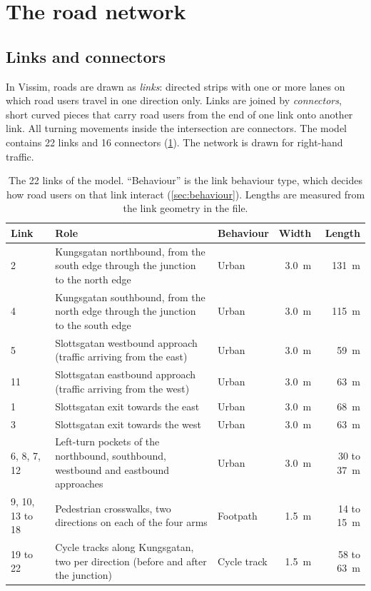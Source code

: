 \documentclass[11pt,a4paper]{article}
\begin{document}
\section{The road network}
\label{sec:network}

\subsection{Links and connectors}

In Vissim, roads are drawn as \emph{links}: directed strips with one or more lanes on which road
users travel in one direction only. Links are joined by \emph{connectors}, short curved pieces that
carry road users from the end of one link onto another link. All turning movements inside the
intersection are connectors. The model contains 22 links and 16 connectors
(\cref{tab:links}). The network is drawn for right-hand traffic.

\begin{table}[!htb]
\centering
\caption[Links of the model]{The 22 links of the model. ``Behaviour'' is the link behaviour type,
which decides how road users on that link interact (\cref{sec:behaviour}). Lengths are measured
from the link geometry in the file.}
\label{tab:links}
\small
\begin{tabularx}{\textwidth}{lXlrr}
\toprule
\textbf{Link} & \textbf{Role} & \textbf{Behaviour} & \textbf{Width} & \textbf{Length}\\
\midrule
2  & Kungsgatan northbound, from the south edge through the junction to the north edge & Urban & 3.0~m & 131~m\\
4  & Kungsgatan southbound, from the north edge through the junction to the south edge & Urban & 3.0~m & 115~m\\
5  & Slottsgatan westbound approach (traffic arriving from the east)  & Urban & 3.0~m & 59~m\\
11 & Slottsgatan eastbound approach (traffic arriving from the west)  & Urban & 3.0~m & 63~m\\
1  & Slottsgatan exit towards the east  & Urban & 3.0~m & 68~m\\
3  & Slottsgatan exit towards the west  & Urban & 3.0~m & 63~m\\
6, 8, 7, 12 & Left-turn pockets of the northbound, southbound, westbound and eastbound approaches
& Urban & 3.0~m & 30 to 37~m\\
9, 10, 13 to 18 & Pedestrian crosswalks, two directions on each of the four arms & Footpath & 1.5~m & 14 to 15~m\\
19 to 22 & Cycle tracks along Kungsgatan, two per direction (before and after the junction) & Cycle track & 1.5~m & 58 to 63~m\\
\bottomrule
\end{tabularx}
\end{table}
\end{document}
